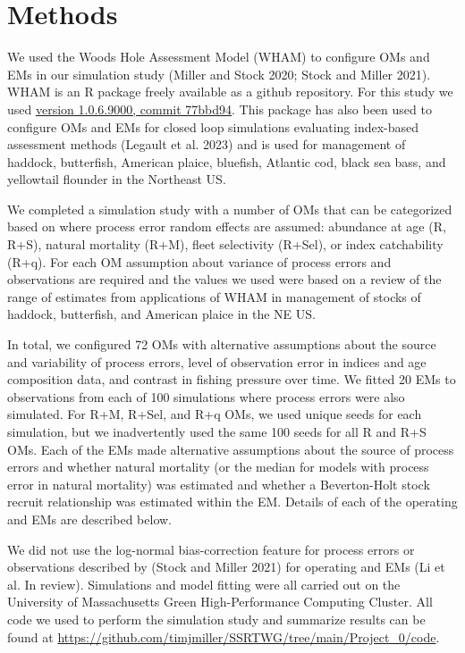 \documentclass[
  12pt,
]{article}
\begin{document}
\hypertarget{methods}{%
\section*{Methods}\label{methods}}

We used the Woods Hole Assessment Model (WHAM) to configure OMs and EMs
in our simulation study (Miller and Stock 2020; Stock and Miller 2021).
WHAM is an R package freely available as a github repository. For this
study we used
\href{https://github.com/timjmiller/wham/tree/77bbd946e4881216a439933473d1c58b21c270c3}{version
1.0.6.9000, commit 77bbd94}. This package has also been used to
configure OMs and EMs for closed loop simulations evaluating index-based
assessment methods (Legault et al. 2023) and is used for management of
haddock, butterfish, American plaice, bluefish, Atlantic cod, black sea
bass, and yellowtail flounder in the Northeast US.

We completed a simulation study with a number of OMs that can be
categorized based on where process error random effects are assumed:
abundance at age (R, R+S), natural mortality (R+M), fleet selectivity
(R+Sel), or index catchability (R+q). For each OM assumption about
variance of process errors and observations are required and the values
we used were based on a review of the range of estimates from
applications of WHAM in management of stocks of haddock, butterfish, and
American plaice in the NE US.

In total, we configured 72 OMs with alternative assumptions about the
source and variability of process errors, level of observation error in
indices and age composition data, and contrast in fishing pressure over
time. We fitted 20 EMs to observations from each of 100 simulations
where process errors were also simulated. For R+M, R+Sel, and R+q OMs,
we used unique seeds for each simulation, but we inadvertently used the
same 100 seeds for all R and R+S OMs. Each of the EMs made alternative
assumptions about the source of process errors and whether natural
mortality (or the median for models with process error in natural
mortality) was estimated and whether a Beverton-Holt stock recruit
relationship was estimated within the EM. Details of each of the
operating and EMs are described below.

We did not use the log-normal bias-correction feature for process errors
or observations described by (Stock and Miller 2021) for operating and
EMs (Li et al. In review). Simulations and model fitting were all
carried out on the University of Massachusetts Green High-Performance
Computing Cluster. All code we used to perform the simulation study and
summarize results can be found at
\url{https://github.com/timjmiller/SSRTWG/tree/main/Project_0/code}.
\end{document}
